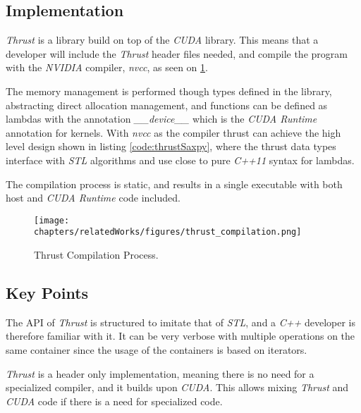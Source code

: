 \subsection{Implementation}
\textit{Thrust} is a library build on top of the \textit{CUDA} library. This means that a developer will include the \textit{Thrust} header files needed, and compile the program with the \textit{NVIDIA} compiler, \textit{nvcc}, as seen on \ref{fig:thrustCompilation}. 

The memory management is performed though types defined in the library, abstracting direct allocation management, and functions can be defined as lambdas with the annotation \textit{\_\_device\_\_} which is the \textit{CUDA Runtime} annotation for kernels. With \textit{nvcc} as the compiler thrust can achieve the high level design shown in listing \ref{code:thrustSaxpy}, where the thrust data types interface with \textit{STL} algorithms and use close to pure \textit{C++11} syntax for lambdas.

The compilation process is static, and results in a single executable with both host and \textit{CUDA Runtime} code included.
\begin{figure}[H]
\center
\texttt{[image: chapters/relatedWorks/figures/thrust\_compilation.png]}
\caption{Thrust Compilation Process.}
\label{fig:thrustCompilation}
\end{figure}

\subsection{Key Points}
The API of \textit{Thrust} is structured to imitate that of \textit{STL}, and a \textit{C++} developer is therefore familiar with it. It can be very verbose with multiple operations on the same container since the usage of the containers is based on iterators.

\textit{Thrust} is a header only implementation, meaning there is no need for a specialized compiler, and it builds upon \textit{CUDA}. This allows mixing \textit{Thrust} and \textit{CUDA} code if there is a need for specialized code.